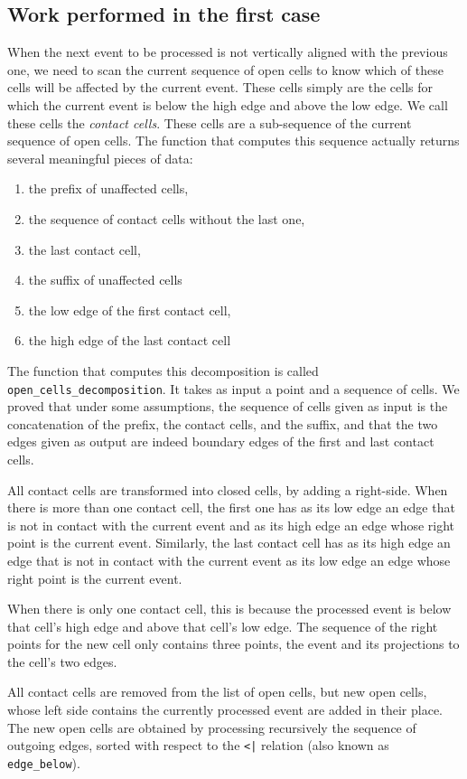 \documentclass[a4paper, USenglish, cleveref, autoref, thm-restate, final]{lipics-v2021}
\begin{document}
\subsection{Work performed in the first case}
When the next event to be processed is not vertically aligned with the
previous one, we need to scan the current sequence of open cells to
know which of these cells will be affected by the current event.
These cells simply are the cells for which the current event is below
the high edge and above the low edge.  We call these cells the {\em
  contact cells}.  These cells are a sub-sequence
of the current sequence of open cells.  The function that computes
this sequence actually returns several meaningful pieces of data:
\begin{enumerate}
\item the prefix of unaffected cells,
\item the sequence of contact cells without the last one,
\item the last contact cell,
\item the suffix of unaffected cells
\item the low edge of the first contact cell,
\item the high edge of the last contact cell
\end{enumerate}
The function that computes this decomposition is called
{\tt open\_cells\_decomposition}.  It takes as input a point and a
sequence of cells.  We proved that under some assumptions, the
sequence of cells given as input is the concatenation of the prefix,
the contact cells, and the suffix, and that the two edges given as
output are indeed boundary edges of the first and last contact cells.

All contact cells are transformed into closed cells, by adding a
right-side.  When there is more than one contact cell, the first one
has as its low edge an edge that is not in contact with the current event
and as its high edge an edge whose right point is the current event.
Similarly, the last contact cell has as its high edge an edge that is not
in contact with the current event as its low edge an edge whose right
point is the current event.

When there is only one contact cell, this is because the processed
event is below that cell's high edge and above that cell's low edge.
The sequence of the right points for the new cell only contains three
points, the event and its projections to the cell's two edges.

All contact cells are removed from the list of open cells, but new
open cells, whose left side contains the currently processed event are
added in their place.  The new open cells are obtained by processing
recursively the sequence of outgoing edges, sorted with respect to the 
{\tt <|} relation (also known as {\tt edge\_below}).
\end{document}
